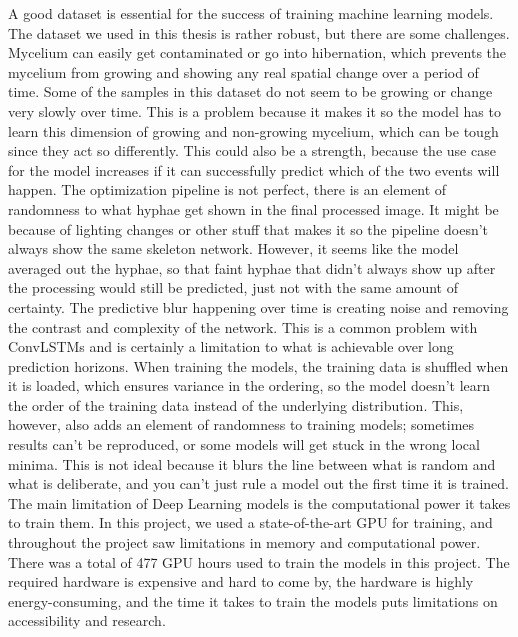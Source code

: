 \documentclass[a4paper,12pt]{article}
\begin{document}
A good dataset is essential for the success of training machine learning models. The dataset we used in this thesis is rather robust, but there are some challenges. Mycelium can easily get contaminated or go into hibernation, which prevents the mycelium from growing and showing any real spatial change over a period of time. Some of the samples in this dataset do not seem to be growing or change very slowly over time. This is a problem because it makes it so the model has to learn this dimension of growing and non-growing mycelium, which can be tough since they act so differently. This could also be a strength, because the use case for the model increases if it can successfully predict which of the two events will happen.
The optimization pipeline is not perfect, there is an element of randomness to what hyphae get shown in the final processed image. It might be because of lighting changes or other stuff that makes it so the pipeline doesn't always show the same skeleton network. However, it seems like the model averaged out the hyphae, so that faint hyphae that didn't always show up after the processing would still be predicted, just not with the same amount of certainty.
The predictive blur happening over time is creating noise and removing the contrast and complexity of the network. This is a common problem with ConvLSTMs and is certainly a limitation to what is achievable over long prediction horizons. When training the models, the training data is shuffled when it is loaded, which ensures variance in the ordering, so the model doesn't learn the order of the training data instead of the underlying distribution. This, however, also adds an element of randomness to training models; sometimes results can't be reproduced, or some models will get stuck in the wrong local minima. This is not ideal because it blurs the line between what is random and what is deliberate, and you can't just rule a model out the first time it is trained.
The main limitation of Deep Learning models is the computational power it takes to train them. In this project, we used a state-of-the-art GPU for training, and throughout the project saw limitations in memory and computational power. There was a total of 477 GPU hours used to train the models in this project. The required hardware is expensive and hard to come by, the hardware is highly energy-consuming, and the time it takes to train the models puts limitations on accessibility and research.
\end{document}
